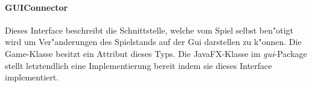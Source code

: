 \paragraph{GUIConnector}
\label{guiConnector}
Dieses Interface beschreibt die Schnittstelle, welche vom Spiel selbst ben"otigt wird um Ver"anderungen des Spielstands auf der Gui darstellen zu k"onnen. Die Game-Klasse besitzt ein Attribut dieses Typs. Die JavaFX-Klasse im \emph{gui}-Package stellt letztendlich eine Implementierung bereit indem sie dieses Interface implementiert. 